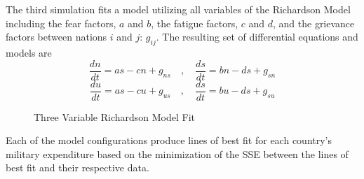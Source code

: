 \documentclass[12pt, centerh1]{article}
\newcommand{\squeezeup}{\vspace{-13.0mm}}
\begin{document}
The third simulation fits a model utilizing all variables of the Richardson Model including the fear factors, $a$ and $b$, the fatigue factors, $c$ and $d$, and the grievance factors between nations $i$ and $j$: $g_{ij}$. The resulting set of differential equations and models are 
\begin{equation*}\label{NS}
    \frac{dn}{dt}= as - cn + g_{ns} \quad ,\quad \frac{ds}{dt} = bn - ds + g_{sn}
\end{equation*}
\begin{equation*}\label{NS}
    \frac{du}{dt}= as - cu + g_{us} \quad ,\quad \frac{ds}{dt} = bu - ds + g_{su}
\end{equation*}
\squeezeup
\begin{figure}[htbp!]
    \centering
    \hfill
    \caption{Three Variable Richardson Model Fit}
\end{figure}
\newpage
Each of the model configurations produce lines of best fit for each country's military expenditure based on the minimization of the SSE between the lines of best fit and their respective data.

\begin{table}[htb!]
\caption{SSE's of Best-Fit Lines by Model Configuration (10s of Billions of Year 2000 USD)}
\label{sse}
\end{table}
\end{document}

